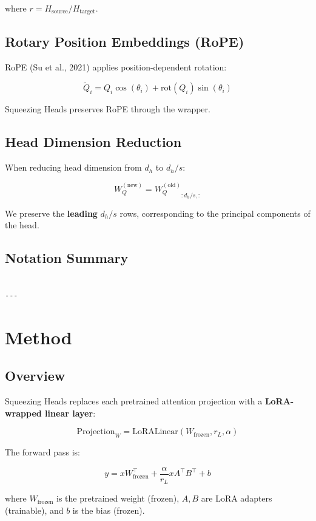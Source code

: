 where $r = H_\text{source} / H_\text{target}$.

\subsection{Rotary Position Embeddings (RoPE)}

RoPE (Su et al., 2021) applies position-dependent rotation:

\[
\tilde{Q}_i = Q_i \cos(\theta_i) + \text{rot}(Q_i) \sin(\theta_i)
\]

Squeezing Heads preserves RoPE through the wrapper.

\subsection{Head Dimension Reduction}

When reducing head dimension from $d_h$ to $d_h / s$:

\[
W_Q^{(\text{new})} = {W_Q^{(\text{old})}}_{:d_h/s, :}
\]

We preserve the \textbf{leading} $d_h / s$ rows, corresponding to the principal 
components of the head.

\subsection{Notation Summary}

\begin{lstlisting}

---
\end{lstlisting}


\section{Method}

\subsection{Overview}

Squeezing Heads replaces each pretrained attention projection with a 
\textbf{LoRA-wrapped linear layer}:

\[
\text{Projection}_{W} = \text{LoRALinear}(W_\text{frozen}, r_L, \alpha)
\]

The forward pass is:

\[
y = x W_\text{frozen}^\top + \frac{\alpha}{r_L} x A^\top B^\top + b
\]

where $W_\text{frozen}$ is the pretrained weight (frozen), $A, B$ are LoRA 
adapters (trainable), and $b$ is the bias (frozen).


